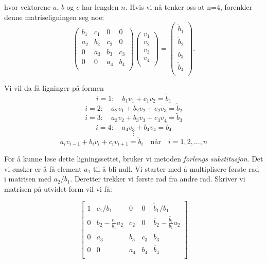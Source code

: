 \documentclass{article}
\begin{document}
hvor vektorene $a$, $b$ og $c$ har lengden $n$. Hvis vi nå tenker oss at n=4, forenkler denne matriseligningen seg noe:
\begin{equation}
    \left(\begin{array}{cccccc}
                           b_1& c_1 & 0 &0 \\
                           a_2 & b_2 & c_2 &0 \\
                           0 & a_3 & b_3 & c_3 \\
                           0 & 0 & a_4 &  b_4  \\
                      \end{array} \right)\left(\begin{array}{c}
                           v_1\\
                           v_2\\
                           v_3\\
                          v_4  \\
                      \end{array} \right)
  =\left(\begin{array}{c}
                           \tilde{b}_1\\
                           \tilde{b}_2\\
                        \tilde{b}_3\\
                        \tilde{b}_4\\
                      \end{array} \right).
\end{equation}

Vi vil da få ligninger på formen
\[i=1: \quad b_1v_1 + c_1v_2 = \tilde{b}_1\]
\[i=2: \quad a_2v_1 + b_2v_2 + c_2v_3 = \tilde{b}_2\]
\[i=3: \quad a_3v_2 + b_3v_3 + c_3v_4 = \tilde{b}_3\]
\[i=4: \quad a_4v_3 + b_4v_4 = \tilde{b}_4\]
\[\vdots\]
\begin{equation}
a_iv_{i-1} + b_iv_i + c_iv_{i+1} = \tilde{b}_i \quad \textrm{når} \quad i = 1,2,...,n
\end{equation}

For å kunne løse dette ligningssettet, bruker vi metoden \textit{forlengs substitusjon}. Det vi ønsker er å få element $a_1$ til å bli null. Vi starter med å multiplisere første rad i matrisen med $a_2/b_1$. Deretter trekker vi første rad fra andre rad. Skriver vi matrisen på utvidet form vil vi få:

\[
\left[
\begin{array}{cccc|c}
1 & c_1/b_1 & 0 & 0 & \tilde{b}_1/b_1 \\
 0 & b_2 - \frac{c_1}{b_1}a_2  &c_2 &0 & \tilde{b_2} - \frac{\tilde{b_1}}{b_1}a_2\\
  0 & a_3 & b_3 & c_3 & \tilde{b_3}\\
  0 & 0 & a_4 & b_4 & \tilde{b_4}\\
\end{array}
\right]
\]
\end{document}
